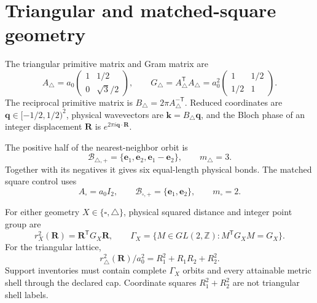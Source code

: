 \documentclass[11pt]{article}
\newcommand{\Z}{\mathbb Z}
\begin{document}
\section{Triangular and matched-square geometry}

The triangular primitive matrix and Gram matrix are
\begin{equation}
 A_{\triangle}=a_0
 \begin{pmatrix}
  1&1/2\\
  0&\sqrt3/2
 \end{pmatrix},
 \qquad
 G_{\triangle}=A_{\triangle}^{\mathsf T}A_{\triangle}
 =a_0^2
 \begin{pmatrix}
  1&1/2\\
  1/2&1
 \end{pmatrix}.
 \label{eq:triangular-metric}
\end{equation}
The reciprocal primitive matrix is
$B_{\triangle}=2\pi A_{\triangle}^{-\mathsf T}$.
Reduced coordinates are $\mathbf q\in[-1/2,1/2)^2$, physical wavevectors are
$\mathbf k=B_{\triangle}\mathbf q$, and the Bloch phase of an integer displacement
$\mathbf R$ is $e^{2\pi i\mathbf q\cdot\mathbf R}$.

The positive half of the nearest-neighbor orbit is
\begin{equation}
 \mathcal B_{\triangle,+}
 =\{\mathbf e_1,\mathbf e_2,\mathbf e_1-\mathbf e_2\},
 \qquad m_{\triangle}=3.
 \label{eq:triangular-bonds}
\end{equation}
Together with its negatives it gives six equal-length physical bonds.  The matched
square control uses
\begin{equation}
 A_{\square}=a_0I_2,
 \qquad
 \mathcal B_{\square,+}=\{\mathbf e_1,\mathbf e_2\},
 \qquad m_{\square}=2.
\end{equation}

For either geometry $X\in\{\square,\triangle\}$, physical squared distance and integer
point group are
\begin{equation}
 r_X^2(\mathbf R)=\mathbf R^{\mathsf T}G_X\mathbf R,
 \qquad
 \Gamma_X=\{M\in GL(2,\Z):M^{\mathsf T}G_XM=G_X\}.
 \label{eq:metric-and-group}
\end{equation}
For the triangular lattice,
\begin{equation}
 r_{\triangle}^2(\mathbf R)/a_0^2
 =R_1^2+R_1R_2+R_2^2.
 \label{eq:triangular-shell-index}
\end{equation}
Support inventories must contain complete $\Gamma_X$ orbits and every attainable metric
shell through the declared cap.  Coordinate squares $R_1^2+R_2^2$ are not triangular
shell labels.
\end{document}
